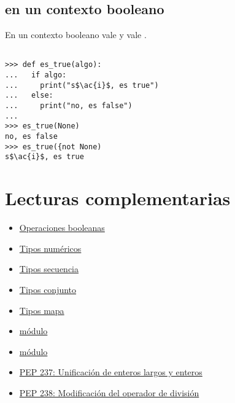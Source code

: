 \subsection{ en un contexto booleano}

En un contexto booleano  vale  y  vale .

\noindent\begin{minipage}{\textwidth}
\begin{lstlisting}[mathescape=True]

>>> def es_true(algo):
...   if algo:
...     print("s$\ac{i}$, es true")
...   else:
...     print("no, es false")
...
>>> es_true(None)
no, es false
>>> es_true({not None)
s$\ac{i}$, es true
\end{lstlisting}
\end{minipage}

\section{Lecturas complementarias}

\begin{itemize}

\item \href{http://docs.python.org/3.1/library/stdtypes.html#boolean-operations-and-or-not}{Operaciones booleanas}

\item \href{http://docs.python.org/3.1/library/stdtypes.html#numeric-types-int-float-long-complex}{Tipos numéricos}

\item \href{http://docs.python.org/3.1/library/stdtypes.html#sequence-types-str-unicode-list-tuple-buffer-xrange}{Tipos secuencia}

\item \href{http://docs.python.org/3.1/library/stdtypes.html#set-types-set-frozenset}{Tipos conjunto}

\item \href{http://docs.python.org/3.1/library/stdtypes.html#mapping-types-dict}{Tipos mapa}

\item \href{http://docs.python.org/3.1/library/fractions.html}{módulo }

\item \href{http://docs.python.org/3.1/library/math.html}{módulo }

\item \href{http://www.python.org/dev/peps/pep-0237/}{PEP 237: Unificación de enteros largos y enteros}

\item \href{http://www.python.org/dev/peps/pep-0238/}{PEP 238: Modificación del operador de división}

\end{itemize}
